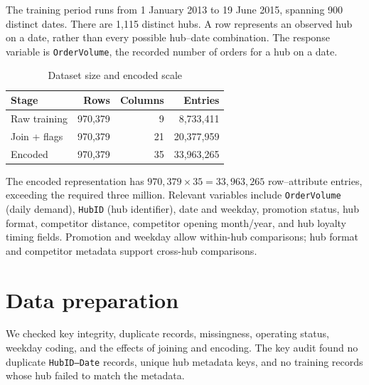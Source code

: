 \documentclass[10pt,a4paper,twocolumn]{article}
\begin{document}
The training period runs from 1 January 2013 to 19 June 2015, spanning 900 distinct dates. There are 1,115 distinct hubs. A row represents an observed hub on a date, rather than every possible hub--date combination. The response variable is \texttt{OrderVolume}, the recorded number of orders for a hub on a date.

\begin{table}[t]
\centering
\caption{Dataset size and encoded scale}
\label{tab:size}
\small
\begin{tabular}{lrrr}
\toprule
Stage & Rows & Columns & Entries\\
\midrule
Raw training & 970,379 & 9 & 8,733,411\\
Join + flags & 970,379 & 21 & 20,377,959\\
Encoded & 970,379 & 35 & 33,963,265\\
\bottomrule
\end{tabular}
\end{table}
The encoded representation has $970{,}379 \times 35 = 33{,}963{,}265$ row--attribute entries, exceeding the required three million. Relevant variables include \texttt{OrderVolume} (daily demand), \texttt{HubID} (hub identifier), date and weekday, promotion status, hub format, competitor distance, competitor opening month/year, and hub loyalty timing fields. Promotion and weekday allow within-hub comparisons; hub format and competitor metadata support cross-hub comparisons.

\section{Data preparation}
We checked key integrity, duplicate records, missingness, operating status, weekday coding, and the effects of joining and encoding. The key audit found no duplicate \texttt{HubID--Date} records, unique hub metadata keys, and no training records whose hub failed to match the metadata.
\end{document}
